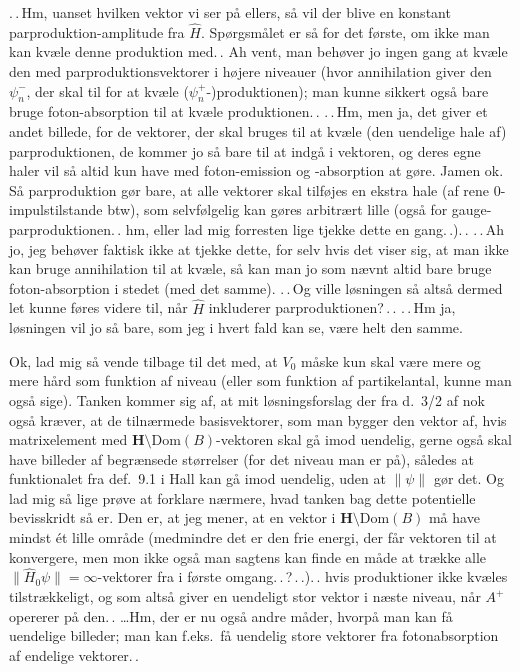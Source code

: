 \documentclass{report}
\begin{document}
.\,.\,Hm, uanset hvilken vektor vi ser på ellers, så vil der blive en konstant parproduktion-amplitude fra $\hat H$. Spørgsmålet er så for det første, om ikke man kan kvæle denne produktion med.\,. Ah vent, man behøver jo ingen gang at kvæle den med parproduktionsvektorer i højere niveauer (hvor annihilation giver den $\psi_n^-$, der skal til for at kvæle ($\psi_n^+$-)produktionen); man kunne sikkert også bare bruge foton-absorption til at kvæle produktionen.\,. .\,.\,Hm, men ja, det giver et andet billede, for de vektorer, der skal bruges til at kvæle (den uendelige hale af) parproduktionen, de kommer jo så bare til at indgå i vektoren, og deres egne haler vil så altid kun have med foton-emission og -absorption at gøre. Jamen ok. Så parproduktion gør bare, at alle vektorer skal tilføjes en ekstra hale (af rene 0-impulstilstande btw), som selvfølgelig kan gøres arbitrært lille (også for gauge-parproduktionen.\,. hm, eller lad mig forresten lige tjekke dette en gang.\,.).\,. .\,.\,Ah jo, jeg behøver faktisk ikke at tjekke dette, for selv hvis det viser sig, at man ikke kan bruge annihilation til at kvæle, så kan man jo som nævnt altid bare bruge foton-absorption i stedet (med det samme). .\,.\,Og ville løsningen så altså dermed let kunne føres videre til, når $\hat H$ inkluderer parproduktionen?\,.\,. .\,.\,Hm ja, løsningen vil jo så bare, som jeg i hvert fald kan se, være helt den samme. 

Ok, lad mig så vende tilbage til det med, at $V_0$ måske kun skal være mere og mere hård som funktion af niveau (eller som funktion af partikelantal, kunne man også sige). Tanken kommer sig af, at mit løsningsforslag der fra d.\ 3/2 af nok også kræver, at de tilnærmede basisvektorer, som man bygger den vektor af, hvis matrixelement med $\mathrm{\textbf{H}} \setminus \mathrm{Dom}(B)$-vektoren skal gå imod uendelig, gerne også skal have billeder af begrænsede størrelser (for det niveau man er på), således at funktionalet fra def.\ 9.1 i Hall kan gå imod uendelig, uden at $\|\psi\|$ gør det. Og lad mig så lige prøve at forklare nærmere, hvad tanken bag dette potentielle bevisskridt så er. Den er, at jeg mener, at en vektor i $\mathrm{\textbf{H}} \setminus \mathrm{Dom}(B)$ må have mindst ét lille område (medmindre det er den frie energi, der får vektoren til at konvergere, men mon ikke også man sagtens kan finde en måde at trække alle $\|\hat H_0 \psi \|= \infty$-vektorer fra i første omgang.\,.\,?\,.\,.).\,. hvis produktioner ikke kvæles tilstrækkeligt, og som altså giver en uendeligt stor vektor i næste niveau, når $A^+$ opererer på den.\,. \ldots Hm, der er nu også andre måder, hvorpå man kan få uendelige billeder; man kan f.eks.\ få uendelig store vektorer fra fotonabsorption af endelige vektorer.\,. 
\end{document}
